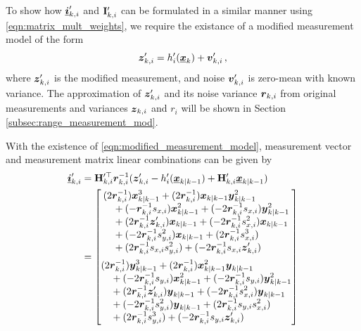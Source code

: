 \documentclass[10pt,letterpaper,oneside,twocolumn,journal]{IEEEtran}
\theoremstyle{definition}
\theoremstyle{definition}
\theoremstyle{remark}
\begin{document}
To show how ${\boldsymbol{\underline{i}}}'_{k,i}$ and ${{\mathbf{I}}}'_{k,i}$ can be formulated in a similar manner using \eqref{eqn:matrix_mult_weights}, we require the existance of a modified measurement model of the form
\begin{equation}
    \rv{z}'_{k,i} = h'_i(\rvec{x}_k)+\rv{v}'_{k,i}\,, \label{eqn:modified_measurement_model}
\end{equation}
where ${\boldsymbol{z}}'_{k,i}$ is the modified measurement, and noise ${\boldsymbol{v}}'_{k,i}$ is zero-mean with known variance. The approximation of ${\boldsymbol{z}}'_{k,i}$ and its noise variance ${\boldsymbol{r}}_{k,i}$ from original measurements and variances ${\boldsymbol{z}}_{k,i}$ and $r_i$ will be shown in Section \ref{subsec:range_measurement_mod}. 

With the existence of \eqref{eqn:modified_measurement_model}, measurement vector and measurement matrix linear combinations can be given by
\begin{equation}
    \begin{split}
        \rvec{i}'_{k,i} &= \mat{H}_{k,i}^{\prime\top} \rv{r}_{k,i}^{-1}(\rv{z}'_{k,i} - h'_i(\rvec{x}_{k|k-1}) + \mat{H}'_{k,i}\rvec{x}_{k|k-1}) \\
        &= 
        \begin{bmatrix}
            \begin{split}
                &(2\rv{r}_{k,i}^{-1})\rv{x}_{k|k-1}^3 + (2\rv{r}_{k,i}^{-1})\rv{x}_{k|k-1}\rv{y}_{k|k-1}^2 \\
                &\quad+ (-\rv{r}_{k,i}^{-1}s_{x,i})\rv{x}_{k|k-1}^2 + (-2\rv{r}_{k,i}^{-1}s_{x,i})\rv{y}_{k|k-1}^2 \\
                &\quad+ (2\rv{r}_{k,i}^{-1}\rv{z}'_{k,i})\rv{x}_{k|k-1} + (-2\rv{r}_{k,i}^{-1}s_{x,i}^2)\rv{x}_{k|k-1}\\
                &\quad+ (-2\rv{r}_{k,i}^{-1}s_{y,i}^2)\rv{x}_{k|k-1} + (2\rv{r}_{k,i}^{-1}s_{x,i}^3) \\
                &\quad+ (2\rv{r}_{k,i}^{-1}s_{x,i}s_{y,i}^2) + (-2\rv{r}_{k,i}^{-1}s_{x,i} \rv{z}'_{k,i})
            \end{split}
            \vspace{5pt}\\
            \begin{split}
                &(2\rv{r}_{k,i}^{-1})\rv{y}_{k|k-1}^3 + (2\rv{r}_{k,i}^{-1})\rv{x}_{k|k-1}^2\rv{y}_{k|k-1} \\
                &\quad+ (-2\rv{r}_{k,i}^{-1}s_{y,i})\rv{x}_{k|k-1}^2 + (-2\rv{r}_{k,i}^{-1}s_{y,i})\rv{y}_{k|k-1}^2 \\
                &\quad+ (2\rv{r}_{k,i}^{-1}\rv{z}'_{k,i})\rv{y}_{k|k-1} + (-2\rv{r}_{k,i}^{-1}s_{x,i}^2)\rv{y}_{k|k-1} \\
                &\quad+ (-2\rv{r}_{k,i}^{-1}s_{y,i}^2)\rv{y}_{k|k-1} + (2\rv{r}_{k,i}^{-1}s_{y,i}s_{x,i}^2) \\
                &\quad+ (2\rv{r}_{k,i}^{-1}s_{y,i}^3) + (-2\rv{r}_{k,i}^{-1}s_{y,i}\rv{z}'_{k,i})
            \end{split}
        \end{bmatrix}
    \end{split} \label{eqn:hrz_linear_comb}
\end{equation}
\end{document}

